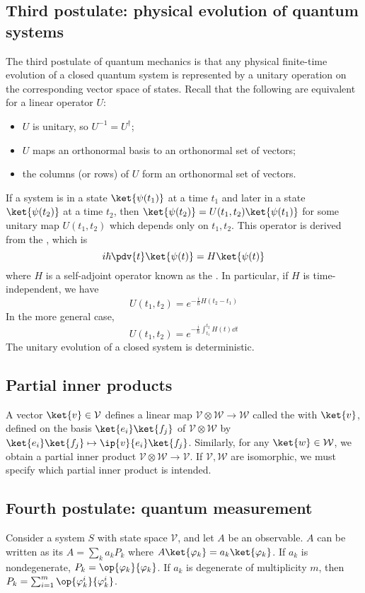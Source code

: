 \subsection{Third postulate: physical evolution of quantum systems}
The third postulate of quantum mechanics is that any physical finite-time evolution of a closed quantum system is represented by a unitary operation on the corresponding vector space of states.
Recall that the following are equivalent for a linear operator $U$:
\begin{itemize}
    \item $U$ is unitary, so $U^{-1} = U^\dagger$;
    \item $U$ maps an orthonormal basis to an orthonormal set of vectors;
    \item the columns (or rows) of $U$ form an orthonormal set of vectors.
\end{itemize}
If a system is in a state $\ket{\psi(t_1)}$ at a time $t_1$ and later in a state $\ket{\psi(t_2)}$ at a time $t_2$, then $\ket{\psi(t_2)} = U(t_1, t_2) \ket{\psi(t_1)}$ for some unitary map $U(t_1, t_2)$ which depends only on $t_1, t_2$.
This operator is derived from the , which is
\[ i\hbar \pdv{t} \ket{\psi(t)} = H \ket{\psi(t)} \]
where $H$ is a self-adjoint operator known as the .
In particular, if $H$ is time-independent, we have
\[ U(t_1, t_2) = e^{-\frac{i}{\hbar} H(t_2 - t_1)} \]
In the more general case,
\[ U(t_1, t_2) = e^{-\frac{i}{\hbar} \int_{t_1}^{t_2} H(t) \dd{t}} \]
The unitary evolution of a closed system is deterministic.

\subsection{Partial inner products}
A vector $\ket{v} \in \mathcal V$ defines a linear map $\mathcal V \otimes \mathcal W \to \mathcal W$ called the  with $\ket{v}$, defined on the basis $\ket{e_i} \ket{f_j}$ of $\mathcal V \otimes \mathcal W$ by $\ket{e_i} \ket{f_j} \mapsto \ip{v}{e_i} \ket{f_j}$.
Similarly, for any $\ket{w} \in \mathcal W$, we obtain a partial inner product $\mathcal V \otimes \mathcal W \to \mathcal V$.
If $\mathcal V, \mathcal W$ are isomorphic, we must specify which partial inner product is intended.

\subsection{Fourth postulate: quantum measurement}
Consider a system $S$ with state space $\mathcal V$, and let $A$ be an observable.
$A$ can be written as its  $A = \sum_k a_k P_k$ where $A \ket{\varphi_k} = a_k \ket{\varphi_k}$.
If $a_k$ is nondegenerate, $P_k = \op{\varphi_k}{\varphi_k}$.
If $a_k$ is degenerate of multiplicity $m$, then $P_k = \sum_{i=1}^m \op{\varphi_k^i}{\varphi_k^i}$.

